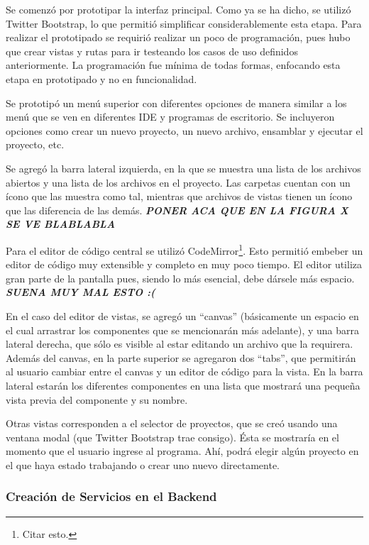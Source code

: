\documentclass[12pt,titlepage,]{article}
\begin{document}
Se comenzó por prototipar la interfaz principal. Como ya se ha dicho, se
utilizó Twitter Bootstrap, lo que permitió simplificar considerablemente
esta etapa. Para realizar el prototipado se requirió realizar un poco de
programación, pues hubo que crear vistas y rutas para ir testeando los
casos de uso definidos anteriormente. La programación fue mínima de
todas formas, enfocando esta etapa en prototipado y no en funcionalidad.

Se prototipó un menú superior con diferentes opciones de manera similar
a los menú que se ven en diferentes IDE y programas de escritorio. Se
incluyeron opciones como crear un nuevo proyecto, un nuevo archivo,
ensamblar y ejecutar el proyecto, etc.

Se agregó la barra lateral izquierda, en la que se muestra una lista de
los archivos abiertos y una lista de los archivos en el proyecto. Las
carpetas cuentan con un ícono que las muestra como tal, mientras que
archivos de vistas tienen un ícono que las diferencia de las demás.
\textbf{\emph{PONER ACA QUE EN LA FIGURA X SE VE BLABLABLA}}

Para el editor de código central se utilizó CodeMirror\footnote{Citar
  esto.}. Esto permitió embeber un editor de código muy extensible y
completo en muy poco tiempo. El editor utiliza gran parte de la pantalla
pues, siendo lo más esencial, debe dársele más espacio.
\textbf{\emph{SUENA MUY MAL ESTO :(}}

En el caso del editor de vistas, se agregó un ``canvas'' (básicamente un
espacio en el cual arrastrar los componentes que se mencionarán más
adelante), y una barra lateral derecha, que sólo es visible al estar
editando un archivo que la requirera. Además del canvas, en la parte
superior se agregaron dos ``tabs'', que permitirán al usuario cambiar
entre el canvas y un editor de código para la vista. En la barra lateral
estarán los diferentes componentes en una lista que mostrará una pequeña
vista previa del componente y su nombre.

Otras vistas corresponden a el selector de proyectos, que se creó usando
una ventana modal (que Twitter Bootstrap trae consigo). Ésta se
mostraría en el momento que el usuario ingrese al programa. Ahí, podrá
elegir algún proyecto en el que haya estado trabajando o crear uno nuevo
directamente.

\subsubsection{Creación de Servicios en el Backend}
\end{document}
